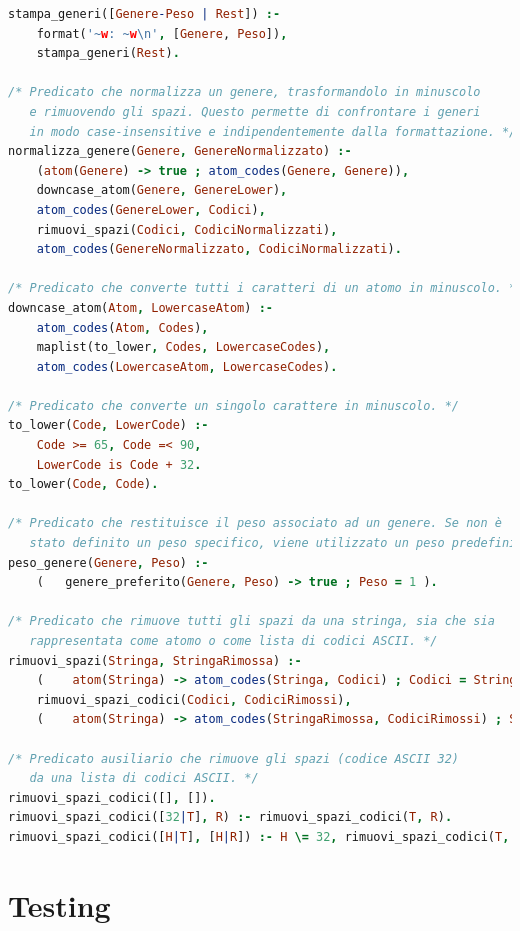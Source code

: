 \documentclass[a4paper,11pt]{article}
\begin{document}
\begin{lstlisting}[language=Prolog]
stampa_generi([Genere-Peso | Rest]) :- 
    format('~w: ~w\n', [Genere, Peso]),
    stampa_generi(Rest).
    
/* Predicato che normalizza un genere, trasformandolo in minuscolo
   e rimuovendo gli spazi. Questo permette di confrontare i generi
   in modo case-insensitive e indipendentemente dalla formattazione. */
normalizza_genere(Genere, GenereNormalizzato) :-
    (atom(Genere) -> true ; atom_codes(Genere, Genere)),
    downcase_atom(Genere, GenereLower),
    atom_codes(GenereLower, Codici),
    rimuovi_spazi(Codici, CodiciNormalizzati),
    atom_codes(GenereNormalizzato, CodiciNormalizzati).

/* Predicato che converte tutti i caratteri di un atomo in minuscolo. */
downcase_atom(Atom, LowercaseAtom) :-
    atom_codes(Atom, Codes),
    maplist(to_lower, Codes, LowercaseCodes),
    atom_codes(LowercaseAtom, LowercaseCodes).

/* Predicato che converte un singolo carattere in minuscolo. */
to_lower(Code, LowerCode) :-
    Code >= 65, Code =< 90,
    LowerCode is Code + 32.
to_lower(Code, Code).

/* Predicato che restituisce il peso associato ad un genere. Se non è
   stato definito un peso specifico, viene utilizzato un peso predefinito (1). */
peso_genere(Genere, Peso) :- 
    (   genere_preferito(Genere, Peso) -> true ; Peso = 1 ).

/* Predicato che rimuove tutti gli spazi da una stringa, sia che sia
   rappresentata come atomo o come lista di codici ASCII. */
rimuovi_spazi(Stringa, StringaRimossa) :-
    (    atom(Stringa) -> atom_codes(Stringa, Codici) ; Codici = Stringa ),
    rimuovi_spazi_codici(Codici, CodiciRimossi),
    (    atom(Stringa) -> atom_codes(StringaRimossa, CodiciRimossi) ; StringaRimossa = CodiciRimossi ).

/* Predicato ausiliario che rimuove gli spazi (codice ASCII 32)
   da una lista di codici ASCII. */
rimuovi_spazi_codici([], []).
rimuovi_spazi_codici([32|T], R) :- rimuovi_spazi_codici(T, R).
rimuovi_spazi_codici([H|T], [H|R]) :- H \= 32, rimuovi_spazi_codici(T, R).

\end{lstlisting}

\newpage
\section{Testing}
\end{document}
